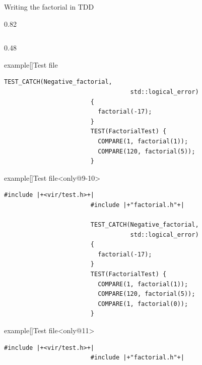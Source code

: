 \begin{frame}[fragile]{Writing the factorial in TDD}
\begin{overlayarea}{\textwidth}{0.82\textheight}
\begin{columns}[T]
\begin{column}{0.48\textwidth}
\begin{varblock}{example}[\textwidth]{Test file}
\begin{lstlisting}[style=MyCpp, belowskip=-10mm]
                        TEST_CATCH(Negative_factorial,
                                   std::logical_error)
                        {
                          factorial(-17);
                        }
                        TEST(FactorialTest) {
                          COMPARE(1, factorial(1));
                          COMPARE(120, factorial(5));
                        }
                    \end{lstlisting}
                    {\scriptsize{}}
                \end{varblock}
                \begin{varblock}{example}[\textwidth]{Test file}<only@9-10>
                    \begin{lstlisting}[style=MyCpp, belowskip=-10mm]
                        #include |+<vir/test.h>+|
                        #include |+"factorial.h"+|

                        TEST_CATCH(Negative_factorial,
                                   std::logical_error)
                        {
                          factorial(-17);
                        }
                        TEST(FactorialTest) {
                          COMPARE(1, factorial(1));
                          COMPARE(120, factorial(5));
                          COMPARE(1, factorial(0));
                        }
                    \end{lstlisting}
                    {\scriptsize{}}
                \end{varblock}
                \begin{varblock}{example}[\textwidth]{Test file}<only@11>
                    \begin{lstlisting}[style=MyCpp, belowskip=-10mm]
                        #include |+<vir/test.h>+|
                        #include |+"factorial.h"+|


\end{lstlisting}
\end{varblock}
\end{column}
\end{columns}
\end{overlayarea}
\end{frame}
